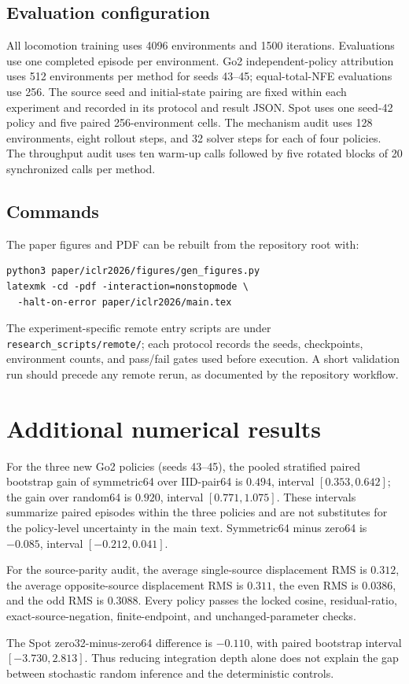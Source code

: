 \documentclass{article}
\begin{document}
\subsection{Evaluation configuration}

All locomotion training uses 4096 environments and 1500 iterations. Evaluations
use one completed episode per environment. Go2 independent-policy attribution
uses 512 environments per method for seeds 43--45; equal-total-NFE evaluations
use 256. The source seed and initial-state pairing are fixed within each
experiment and recorded in its protocol and result JSON. Spot uses one seed-42
policy and five paired 256-environment cells. The mechanism audit uses 128
environments, eight rollout steps, and 32 solver steps for each of four
policies. The throughput audit uses ten warm-up calls followed by five rotated
blocks of 20 synchronized calls per method.

\subsection{Commands}

The paper figures and PDF can be rebuilt from the repository root with:
\begin{verbatim}
python3 paper/iclr2026/figures/gen_figures.py
latexmk -cd -pdf -interaction=nonstopmode \
  -halt-on-error paper/iclr2026/main.tex
\end{verbatim}
The experiment-specific remote entry scripts are under
\texttt{research\_scripts/remote/}; each protocol records the seeds, checkpoints,
environment counts, and pass/fail gates used before execution. A short
validation run should precede any remote rerun, as documented by the repository
workflow.

\section{Additional numerical results}

For the three new Go2 policies (seeds 43--45), the pooled stratified paired
bootstrap gain of symmetric64 over IID-pair64 is $0.494$, interval
$[0.353,0.642]$; the gain over random64 is $0.920$, interval
$[0.771,1.075]$. These intervals summarize paired episodes within the three
policies and are not substitutes for the policy-level uncertainty in the main
text. Symmetric64 minus zero64 is $-0.085$, interval $[-0.212,0.041]$.

For the source-parity audit, the average single-source displacement RMS is
$0.312$, the average opposite-source displacement RMS is $0.311$, the even RMS
is $0.0386$, and the odd RMS is $0.3088$. Every policy passes the locked cosine,
residual-ratio, exact-source-negation, finite-endpoint, and unchanged-parameter
checks.

The Spot zero32-minus-zero64 difference is $-0.110$, with paired bootstrap
interval $[-3.730,2.813]$. Thus reducing integration depth alone does not explain
the gap between stochastic random inference and the deterministic controls.
\end{document}
